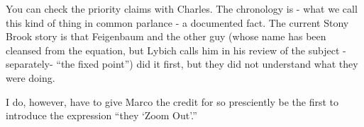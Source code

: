 \begin{description}
You can check the priority claims with Charles. The chronology is - what
we call this kind of thing in common parlance - a documented fact. The
current Stony Brook story is that Feigenbaum and the other guy (whose
name has been cleansed from the equation, but Lybich calls him in his
review of the subject -separately- ``the fixed point'') did it first, but
they did not understand what they were doing.

I do, however, have to give Marco the credit for so presciently be the
first to introduce the expression ``they  `Zoom Out'.''

\end{description}



\printbibliography[heading=subbibintoc,title={References}]
